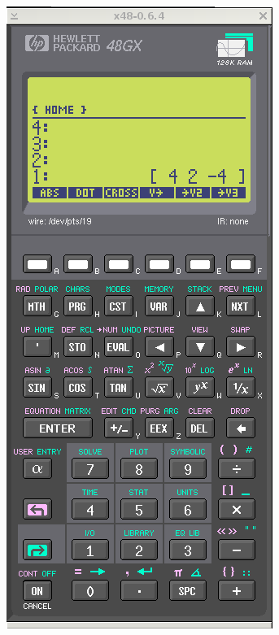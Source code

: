 \documentclass[11pt]{article}
\begin{document}
\includegraphics[scale,height=0.8\textheight]{20180422153111-cross-product02.png}
\end{document}

